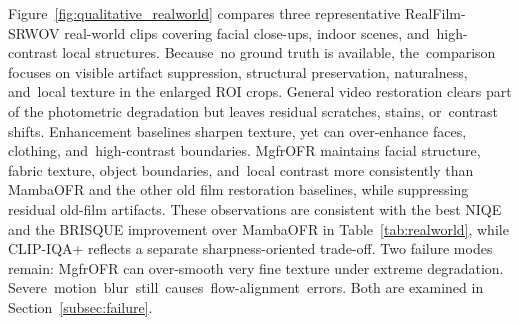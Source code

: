 \documentclass[symmetry,article,accept,pdftex,moreauthors]{Definitions/mdpi}
\begin{document}
Figure~\ref{fig:qualitative_realworld} compares three representative RealFilm-SRWOV real-world clips covering facial close-ups, indoor scenes, and~high-contrast local structures. Because~no ground truth is available, the~comparison focuses on visible artifact suppression, structural preservation, naturalness, and~local texture in the enlarged ROI crops. General video restoration clears part of the photometric degradation but leaves residual scratches, stains, or~contrast shifts. Enhancement baselines sharpen texture, yet can over-enhance faces, clothing, and~high-contrast boundaries. MgfrOFR maintains facial structure, fabric texture, object boundaries, and~local contrast more consistently than MambaOFR and the other old film restoration baselines, while suppressing residual old-film artifacts. These observations are consistent with the best NIQE and the BRISQUE improvement over MambaOFR in Table~\ref{tab:realworld}, while CLIP-IQA+ reflects a separate sharpness-oriented trade-off. Two failure modes remain: MgfrOFR can over-smooth very fine texture under extreme degradation. \mbox{Severe motion blur still causes flow-alignment errors.} Both are examined in Section~\ref{subsec:failure}.
\end{document}
